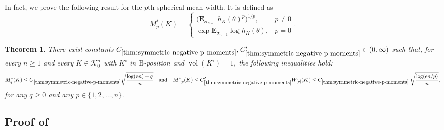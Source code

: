\documentclass[11pt]{amsart}
\newcommand{\E}{\mathbf E}
\newcommand{\Vol}{\operatorname{vol}}
\newcommand{\1}{\mathbf 1}
\newcommand{\e}{\mathrm{e}}
\newcommand{\Bodies}{\mathcal{K}_0^n}
\newcommand{\Bobkov}{\mathrm{B}}
\let\vol\Vol
\theoremstyle{plain}
\newtheorem{theorem}{Theorem}[section]
\begin{document}
In fact, we prove the following result for the $p$th spherical mean width. It is defined as 
\[
M^\ast_p(K) = \begin{cases} 
\Big(\E_{\sigma_{n-1}} \, h_K(\theta)^p\Big)^{1/p}, & p \neq 0 \\ 
\exp \E_{\sigma_{n-1}} \log h_K(\theta), & p = 0
\end{cases}.
\]
\begin{theorem}
\label{thm:symmetric-negative-p-moments}
There exist constants $C_{\ref{thm:symmetric-negative-p-moments}}, C_{\ref{thm:symmetric-negative-p-moments}}' \in (0, \infty)$ such that,
for every $n \geq 1$ and every $K \in \Bodies$ with $K^\circ$ in $\Bobkov$-position and $\vol(K^\circ) = 1$, the following inequalities hold:
\[
M^\ast_q(K) \leq C_{\ref{thm:symmetric-negative-p-moments}} \sqrt{\frac{\log(\e n) + q}{n}} 
\quad \mbox{and} \quad 
M^\ast_{-p}(K) \leq 
C_{\ref{thm:symmetric-negative-p-moments}}' 
W_{[p]}(K) \leq 
C_{\ref{thm:symmetric-negative-p-moments}} \, 
\sqrt{\frac{\log(\e n/p)}{n}},
\]
for any $q \geq 0$ and any $p \in \{1, 2, \dots, n\}$.
\end{theorem}

\subsection{Proof of~\texorpdfstring{}{the quermassintegral theorem}}
\label{sec:proof-of-quermassintegrals} 
\end{document}
